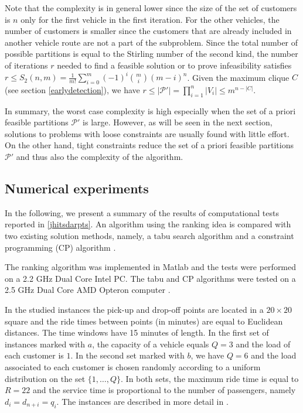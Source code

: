 \documentclass[dissertation,draft*]{aaltoseries}
\begin{document}
Note that the complexity is in general lower since the size of the set of customers is
$n$ only for the first vehicle in the first iteration. For the other vehicles, the number of customers is
smaller since the customers that are already included in another vehicle route
are not a part of the subproblem. 
Since the total number of possible partitions is 
equal to the Stirling number of the second kind, the number of iterations $r$ needed to find a feasible solution
or to prove infeasibility satisfies $r \leq S_2(n,m) = \frac {1}{m!} \sum_{i=0}^{m} (-1)^i {m \choose i} (m-i)^n$.
Given the maximum clique $C$ (see section \ref{earlydetection}), we have $r \leq |\mathcal{P}'| = \prod_{i=1}^n |V_i| \leq m^{n-|C|}$.

In summary, the worst case complexity is high especially when the set of a priori feasible partitions $\mathcal{P}'$ is large. 
However, as will be seen in the next section, solutions to problems with loose constraints are usually found with little effort. 
On the other hand, tight constraints reduce the set of a priori feasible partitions $\mathcal{P}'$ 
and thus also the complexity of the algorithm.


\subsection{Numerical experiments}
\label{mvexperience}
In the following, we present a summary of the results of computational tests reported in \ref{jhitsdarpts}.
An algorithm using the ranking idea is compared with two existing solution methods,
namely, a tabu search algorithm \citep{cordeau02} and
a constraint programming (CP) algorithm \citep{berbegliafeas}. 

The ranking algorithm was implemented in Matlab and the tests were performed on a 2.2 GHz Dual Core Intel PC. 
The tabu and CP algorithms were tested on a 2.5 GHz Dual Core AMD Opteron computer \citep{berbegliathesis}. 

In the studied instances the pick-up and drop-off points are located in a $20 \times 20$ square and the 
ride times between points (in minutes) are equal to Euclidean distances. The time windows
have 15 minutes of length. In the first set of instances marked with $a$, the capacity of a vehicle equals $Q=3$ and 
the load of each customer is $1$. In the 
second set marked with $b$, we have $Q=6$ and the load associated to each customer
is chosen randomly according to a uniform distribution on the set $\{1, \ldots,Q\}$.
In both sets, the maximum ride time is equal to $R=22$ and the service time is 
proportional to the number of passengers, namely $d_i = d_{n+i} = q_i$.
The instances are described in more detail in \citep{cordeau01,ropke2007,berbegliafeas}.
\end{document}
